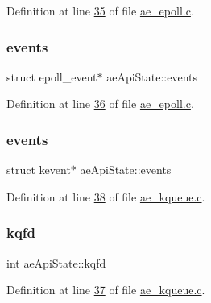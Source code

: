 Definition at line \hyperlink{ae__epoll_8c_source_l00035}{35} of file \hyperlink{ae__epoll_8c_source}{ae\+\_\+epoll.\+c}.

\mbox{\label{structaeApiState_aae9919a5fbc7f635b7add5e9afca911f}} 
\subsubsection{\texorpdfstring{events}{events}\hspace{0.1cm}{\footnotesize\ttfamily [1/2]}}
{\footnotesize\ttfamily struct epoll\+\_\+event$\ast$ ae\+Api\+State\+::events}



Definition at line \hyperlink{ae__epoll_8c_source_l00036}{36} of file \hyperlink{ae__epoll_8c_source}{ae\+\_\+epoll.\+c}.

\mbox{\label{structaeApiState_a3dad05e80c97db4396002b7e77e02c9c}} 
\subsubsection{\texorpdfstring{events}{events}\hspace{0.1cm}{\footnotesize\ttfamily [2/2]}}
{\footnotesize\ttfamily struct kevent$\ast$ ae\+Api\+State\+::events}



Definition at line \hyperlink{ae__kqueue_8c_source_l00038}{38} of file \hyperlink{ae__kqueue_8c_source}{ae\+\_\+kqueue.\+c}.

\mbox{\label{structaeApiState_a091974c7b256e357ff535ce63012ff84}} 
\subsubsection{\texorpdfstring{kqfd}{kqfd}}
{\footnotesize\ttfamily int ae\+Api\+State\+::kqfd}



Definition at line \hyperlink{ae__kqueue_8c_source_l00037}{37} of file \hyperlink{ae__kqueue_8c_source}{ae\+\_\+kqueue.\+c}.

